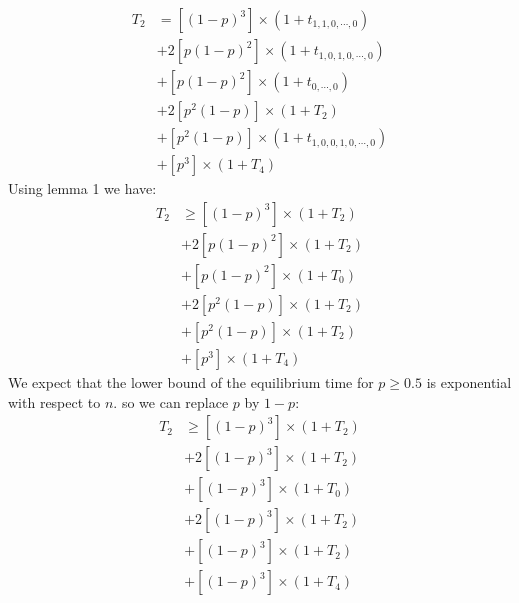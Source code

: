 \documentclass[]{book}
\theoremstyle{definition}
\begin{document}
\begin{equation}
\begin{split}
    T_2 &= \left[ \left( 1-p \right)^3 \right] \times \left( 1+t_{1,1,0,\cdots,0} \right) \\
    &+ 2\left[ p\left( 1-p \right)^2 \right] \times \left( 1+t_{1,0,1,0,\cdots,0} \right) \\
    &+ \left[ p\left( 1-p \right)^2 \right] \times \left( 1+t_{0,\cdots,0} \right) \\
    &+ 2\left[ p^2\left( 1-p \right) \right] \times \left( 1+T_2 \right) \\
    &+ \left[ p^2\left( 1-p \right) \right] \times \left( 1+t_{1,0,0,1,0,\cdots,0} \right) \\
    &+ \left[ p^3 \right] \times \left( 1+T_4 \right)
\end{split}
\end{equation}
Using lemma 1 we have:
\begin{equation}
\begin{split}
T_2 &\ge \left[ \left( 1-p \right)^3 \right] \times \left( 1+T_2 \right) \\
    &+ 2\left[ p\left( 1-p \right)^2 \right] \times \left( 1+T_2 \right) \\
    &+ \left[ p\left( 1-p \right)^2 \right] \times \left( 1+T_0 \right) \\
    &+ 2\left[ p^2\left( 1-p \right) \right] \times \left( 1+T_2 \right) \\
    &+ \left[ p^2\left( 1-p \right) \right] \times \left( 1+T_2 \right) \\
    &+ \left[ p^3 \right] \times \left( 1+T_4 \right)
\end{split}
\end{equation}
We expect that the lower bound of the equilibrium time for $p \ge 0.5$ is exponential with respect to $n$. so we can replace $p$ by $1-p$:
\begin{equation}
\begin{split}
    T_2 &\ge \left[ \left( 1-p \right)^3 \right] \times \left( 1+T_2 \right) \\
    &+ 2\left[ \left( 1-p \right)^3 \right] \times \left( 1+T_2 \right) \\
    &+ \left[ \left( 1-p \right)^3 \right] \times \left( 1+T_0 \right) \\
    &+ 2\left[ \left( 1-p \right)^3 \right] \times \left( 1+T_2 \right) \\
    &+ \left[ \left( 1-p \right)^3 \right] \times \left( 1+T_2 \right) \\
    &+ \left[ \left( 1-p \right)^3 \right] \times \left( 1+T_4 \right)
\end{split}
\end{equation}
\end{document}
